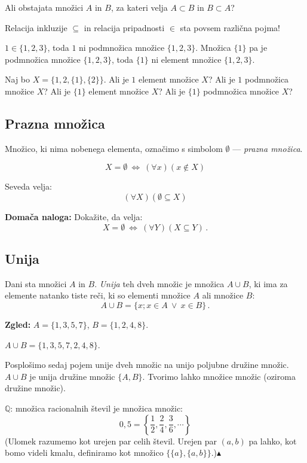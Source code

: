 \documentclass[12pt,a4paper]{article}
\def\ali {{~\vee~}}
\def\cee {{~\Leftrightarrow~}}
\def\zgled{\noindent{\bf\color{blue} Zgled: }}
\def\kz{{\hfill{\color{blue}$\blacktriangle$}}}%
\begin{document}
\medskip
{} Ali obstajata množici $A$ in $B$, za kateri velja $A\subset B$ in $B\subset A$?

\bigskip
{} Relacija inkluzije $\subseteq$ in relacija pripadnosti $\in$ sta povsem različna pojma!

$1\in\{1,2,3\}$, toda $1$ ni podmnožica množice $\{1,2,3\}$.
Množica $\{1\}$ pa je podmnožica množice $\{1,2,3\}$, toda
$\{1\}$ ni element množice $\{1,2,3\}$.

\bigskip
{} Naj bo $X = \{1,2,\{1\},\{2\}\}$.
Ali je $1$ element množice $X$?
Ali je $1$ podmnožica množice $X$?
Ali je $\{1\}$ element množice $X$?
Ali je $\{1\}$ podmnožica množice $X$?

\bigskip
\subsection*{Prazna množica}
Množico, ki nima nobenega elementa, označimo s simbolom $\emptyset$ --- {\em prazna množica}.

$$X = \emptyset \cee (\forall x)(x\not\in X)$$

Seveda velja:
$$(\forall X) (\emptyset \subseteq X)$$

{\bf Domača naloga:} Dokažite, da velja:
$$X = \emptyset\cee (\forall Y)(X\subseteq Y)\,.$$

\subsection*{Unija}

Dani sta množici $A$ in $B$. {\em Unija} teh dveh množic je množica $A\cup B$, ki ima za elemente natanko tiste reči, ki so elementi množice $A$ ali množice $B$:
$$A\cup B = \{x; x\in A \ali x\in B\}\,.$$

{\bf Zgled:}
$A = \{1,3,5,7\}$, $B = \{1,2,4,8\}$.

$A\cup B = \{1,3,5,7,2,4,8\}$.

\medskip
Posplošimo sedaj pojem unije dveh množic na unijo poljubne družine množic.
$A\cup B$ je unija družine množic $\{A,B\}$.
Tvorimo lahko množice množic (oziroma družine množic).

\zgled
$\mathbb{Q}$: množica racionalnih števil je množica množic:
$$0,5 = \left\{\frac{1}{2}, \frac{2}{4}, \frac{3}{6}, \cdots\right\}$$
(Ulomek razumemo kot urejen par celih števil. Urejen par $(a,b)$ pa lahko, kot bomo videli kmalu, definiramo kot množico $\{\{a\},\{a,b\}\}$.)\kz
\end{document}
